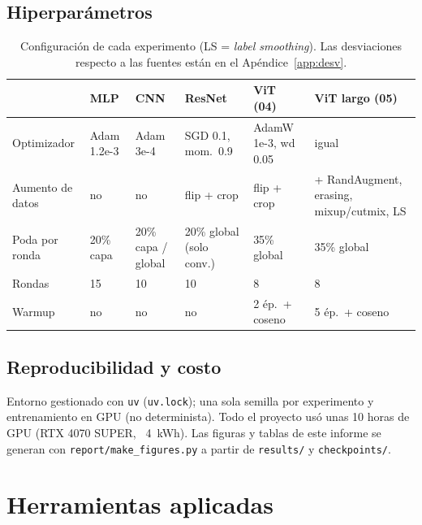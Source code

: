 \documentclass[11pt]{article}
\begin{document}
\subsection{Hiperparámetros}
\begin{table}[H]
\centering\small
\begin{tabularx}{\textwidth}{@{}lYYYYY@{}}
\toprule
 & MLP & CNN & ResNet & ViT (04) & ViT largo (05) \\
\midrule
Optimizador & Adam 1.2e-3 & Adam 3e-4 & SGD 0.1, mom.\ 0.9 & AdamW 1e-3, wd 0.05 & igual \\
Aumento de datos & no & no & flip + crop & flip + crop & + RandAugment, erasing, mixup/cutmix, LS \\
Poda por ronda & 20\% capa & 20\% capa / global & 20\% global (solo conv.) & 35\% global & 35\% global \\
Rondas & 15 & 10 & 10 & 8 & 8 \\
Warmup & no & no & no & 2 ép.\ + coseno & 5 ép.\ + coseno \\
\bottomrule
\end{tabularx}
\caption{Configuración de cada experimento (LS = \textit{label smoothing}). Las desviaciones respecto a las fuentes están en el Apéndice~\ref{app:desv}.}
\end{table}

\subsection{Reproducibilidad y costo}
Entorno gestionado con \texttt{uv} (\texttt{uv.lock}); una sola semilla por experimento y entrenamiento en GPU (no determinista). Todo el proyecto usó unas 10 horas de GPU (RTX 4070 SUPER, ~4~kWh). Las figuras y tablas de este informe se generan con \texttt{report/make\_figures.py} a partir de \texttt{results/} y \texttt{checkpoints/}.

\newpage
\section{Herramientas aplicadas}
\end{document}
